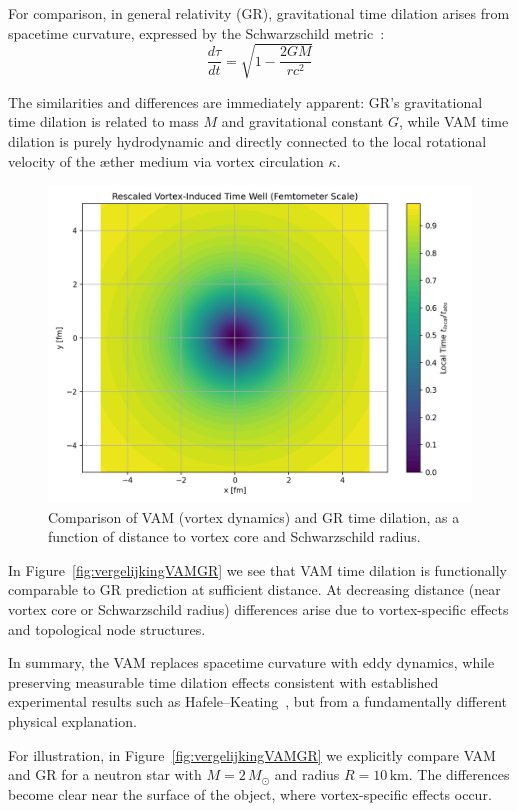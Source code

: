 For comparison, in general relativity (GR), gravitational time dilation arises from spacetime curvature, expressed by the Schwarzschild metric~\cite{schutz2009first}:
\begin{equation}\label{eq:GRtime}
\frac{d\tau}{dt} = \sqrt{1 - \frac{2GM}{rc^2}}
\end{equation}

The similarities and differences are immediately apparent: GR's gravitational time dilation is related to mass $M$ and gravitational constant $G$, while VAM time dilation is purely hydrodynamic and directly connected to the local rotational velocity of the æther medium via vortex circulation $\kappa$.

\begin{figure}[ht!]
    \centering
    \includegraphics[width=0.7\linewidth]{RadialProfileOfLocalTimeDilation_Vortex-Induced_Time_Well}
    \caption{Comparison of VAM (vortex dynamics) and GR time dilation, as a function of distance to vortex core and Schwarzschild radius.}
    \label{fig:vergelijking_VAMGR}
\end{figure}

In Figure~\ref{fig:vergelijkingVAMGR} we see that VAM time dilation is functionally comparable to GR prediction at sufficient distance. At decreasing distance (near vortex core or Schwarzschild radius) differences arise due to vortex-specific effects and topological node structures.

In summary, the VAM replaces spacetime curvature with eddy dynamics, while preserving measurable time dilation effects consistent with established experimental results such as Hafele–Keating~\cite{hafele1972around}, but from a fundamentally different physical explanation.

For illustration, in Figure~\ref{fig:vergelijkingVAMGR} we explicitly compare VAM and GR for a neutron star with $M = 2\,M_\odot$ and radius $R = 10\,\text{km}$. The differences become clear near the surface of the object, where vortex-specific effects occur.

